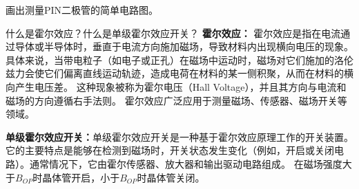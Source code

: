 \documentclass[dvipsnames, svgnames,a4paper,11pt]{article}
\begin{document}
\begin{question}
    画出测量PIN二极管的简单电路图。
    \tcblower
    \begin{figure}[H]     
		\centering  %
			
	\end{figure}  
\end{question}

\begin{question}
   什么是霍尔效应？什么是单级霍尔效应开关？
    \tcblower
    \textbf{霍尔效应：}  霍尔效应是指在电流通过导体或半导体时，垂直于电流方向施加磁场，导致材料内出现横向电压的现象。具体来说，当带电粒子（如电子或正孔）在磁场中运动时，磁场对它们施加的洛伦兹力会使它们偏离直线运动轨迹，造成电荷在材料的某一侧积聚，从而在材料的横向产生电压差。
    这种现象被称为霍尔电压（Hall Voltage），并且其方向与电流和磁场的方向遵循右手法则。
    霍尔效应广泛应用于测量磁场、传感器、磁场开关等领域。

    \textbf{单级霍尔效应开关：}单级霍尔效应开关是一种基于霍尔效应原理工作的开关装置。它的主要特点是能够在检测到磁场时，开关状态发生变化（例如，开启或关闭电路）。通常情况下，它由霍尔传感器、放大器和输出驱动电路组成。
    在磁场强度大于$B_{OP}$时晶体管开启，小于$B_{OP}$时晶体管关闭。
\end{question}
\end{document}
